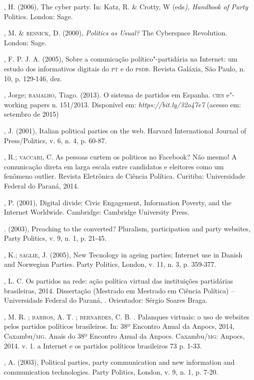 \begin{bibliohedra}
, H. (2006), The cyber party. In: Katz, R. \& Crotty, W
(eds\emph{), Handbook of Party} Politics. London: Sage.

, M. \& \textsc{resnick}, D. (2000), \emph{Politics as Usual?} The
Cyberspace Revolution. London: Sage.

, F. P. J. A. (2005), Sobre a comunicação político"-partidária na
Internet: um estudo dos informativos digitais do \textsc{pt} e do \textsc{psdb}. Revista
Galáxia, São Paulo, n. 10, p. 129-146, dez.

, Jorge; \textsc{ramalho}, Tiago. (2013). O sistema de partidos em Espanha.
\textsc{cies} e"-working papers n. 151/2013. Disponível em:
\emph{https://bit.ly/32o47e7}
(acesso em: setembro de 2015)

, J. (2001), Italian political parties on the web. Harvard
International Journal of Press/Politics, v. 6, n. 4, p. 60-87.

, R.; \textsc{vaccari}, C. As pessoas curtem os politicos no Facebook? Não
mesmo! A comunicação direta em larga escala entre candidatos e eleitores
como um fenômeno outlier. Revista Eletrônica de Ciência Política.
Curitiba: Universidade Federal do Paraná, 2014.

, P. (2001), Digital divide: Civic Engagement, Information
Poverty, and the Internet Worldwide. Cambridge: Cambridge University
Press.

\titidem. (2003), Preaching to the converted? Pluralism, participation
and party websites, Party Politics, v. 9, n. 1, p. 21-45.

, K.; \textsc{saglie}, J. (2005), New Tecnology in ageing parties;
Internet use in Danish and Norwegian Parties. Party Politics, London, v.
11, n. 3, p. 359-377.

, L. C. Os partidos na rede: ação política virtual das instituições
partidárias brasileiras, 2014. Dissertação (Mestrado em Mestrado em
Ciência Política) -- Universidade Federal do Paraná, . Orientador:
Sérgio Soares Braga.

, M. R. ; \textsc{barros}, A. T. ; \textsc{bernardes}, C. B. . Palanques
virtuais: o uso de websites pelos partidos políticos brasileiros. In:
38º Encontro Anual da Anpocs, 2014, Caxambu/\textsc{mg}. Anais do 38º Encontro
Anual da Anpocs. Caxambu/\textsc{mg}: Anpocs, 2014. v. 1. a Internet e os
partidos políticos brasileiros 73 p. 1-33.

, A. (2003), Political parties, party communication and new
information and communication technologies. Party Politics, London, v.
9, n. 1, p. 7-20.


\end{bibliohedra}
